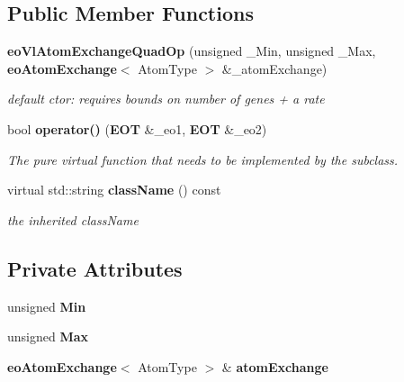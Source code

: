 \subsection*{Public Member Functions}
\begin{CompactItemize}
\item 
{\bf eo\-Vl\-Atom\-Exchange\-Quad\-Op} (unsigned \_\-Min, unsigned \_\-Max, {\bf eo\-Atom\-Exchange}$<$ Atom\-Type $>$ \&\_\-atom\-Exchange)\label{classeo_vl_atom_exchange_quad_op_a0}

\begin{CompactList}\small\item\em default ctor: requires bounds on number of genes + a rate \item\end{CompactList}\item 
bool {\bf operator()} ({\bf EOT} \&\_\-eo1, {\bf EOT} \&\_\-eo2)\label{classeo_vl_atom_exchange_quad_op_a1}

\begin{CompactList}\small\item\em The pure virtual function that needs to be implemented by the subclass. \item\end{CompactList}\item 
virtual std::string {\bf class\-Name} () const \label{classeo_vl_atom_exchange_quad_op_a2}

\begin{CompactList}\small\item\em the inherited class\-Name \item\end{CompactList}\end{CompactItemize}
\subsection*{Private Attributes}
\begin{CompactItemize}
\item 
unsigned {\bf Min}\label{classeo_vl_atom_exchange_quad_op_r0}

\item 
unsigned {\bf Max}\label{classeo_vl_atom_exchange_quad_op_r1}

\item 
{\bf eo\-Atom\-Exchange}$<$ Atom\-Type $>$ \& {\bf atom\-Exchange}\label{classeo_vl_atom_exchange_quad_op_r2}

\end{CompactItemize}


